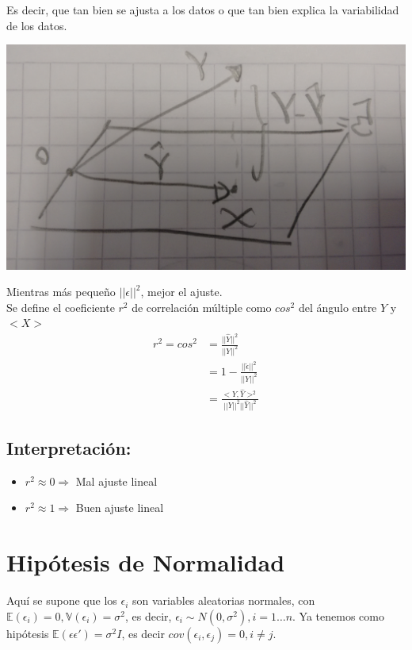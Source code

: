 \documentclass[10pt]{article}
\theoremstyle{plain}
\theoremstyle{definition}
\begin{document}
Es decir, que tan bien se ajusta a los datos o que tan bien explica la variabilidad de los datos.
\begin{center}
\includegraphics[scale=0.1]{imagenes/proyeccion.jpg}
\end{center}
Mientras más pequeño $||\epsilon||^2$, mejor el ajuste.\\

Se define el coeficiente $r^2$ de correlación múltiple como $cos^2$ del ángulo entre $Y$ y $<X>$
\begin{align*}
r^2=cos^2 &= \frac{||\hat{Y}||^2}{||Y||^2}\\
&= 1-\frac{||\hat{\epsilon}||^2}{||Y||^2}\\
&= \frac{<Y,\hat{Y}>^2}{||Y||^2||\hat{Y}||^2}
\end{align*}
\subsection{Interpretación:}
\begin{itemize}
\item $r^2 \approx 0 \Rightarrow$ Mal ajuste lineal
\item $r^2 \approx 1 \Rightarrow$ Buen ajuste lineal
\end{itemize}

\section{Hipótesis de Normalidad}
Aquí se supone que los $\epsilon_{i}$ son variables aleatorias normales, con $\mathbb{E}(\epsilon_{i}) = 0, \mathbb{V}(\epsilon_{i}) = \sigma^2$, es decir, $\epsilon_{i} \sim N(0,\sigma^2), i = 1\ldots n$. Ya tenemos como hipótesis $\mathbb{E}(\epsilon\epsilon') = \sigma^2I$, es decir $cov(\epsilon_{i},\epsilon_{j})=0, i\not = j$.\\
\end{document}
